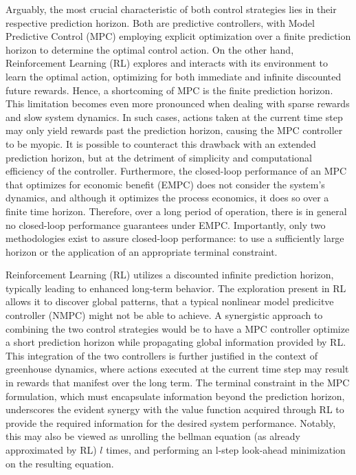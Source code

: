 Arguably, the most crucial characteristic of both control strategies lies in their respective prediction horizon. Both are predictive controllers, with Model Predictive Control (MPC) employing explicit optimization over a finite prediction horizon to determine the optimal control action. On the other hand, Reinforcement Learning (RL) explores and interacts with its environment to learn the optimal action, optimizing for both immediate and infinite discounted future rewards.
Hence, a shortcoming of MPC is the finite prediction horizon. This limitation becomes even more pronounced when dealing with sparse rewards and slow system dynamics. In such cases, actions taken at the current time step may only yield rewards past the prediction horizon, causing the MPC controller to be myopic. It is possible to counteract this drawback with an extended prediction horizon, but at the detriment of simplicity and computational efficiency of the controller. Furthermore, the closed-loop performance of an MPC that optimizes for economic benefit (EMPC) does not consider the system's dynamics, and although it optimizes the process economics, it does so over a finite time horizon. Therefore, over a long period of operation, there is in general no closed-loop performance guarantees under EMPC. Importantly, only two methodologies exist to assure closed-loop performance: to use a sufficiently large horizon or the application of an appropriate terminal constraint.

Reinforcement Learning (RL) utilizes a discounted infinite prediction horizon, typically leading to enhanced long-term behavior. The exploration present in RL allows it to discover global patterns, that a typical nonlinear model predicitve controller (NMPC) might not be able to achieve.  A synergistic approach to combining the two control strategies would be to have a MPC controller optimize a short prediction horizon while propagating global information provided by RL. This integration of the two controllers is further justified in the context of greenhouse dynamics, where actions executed at the current time step may result in rewards that manifest over the long term. The terminal constraint in the MPC formulation, which must encapsulate information beyond the prediction horizon, underscores the evident synergy with the value function acquired through RL to provide the required information for the desired system performance. Notably, this may also be viewed as unrolling the bellman equation (as already approximated by RL) $l$ times, and performing an l-step look-ahead minimization on the resulting equation.

